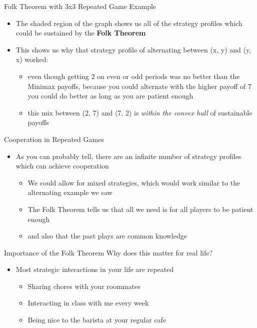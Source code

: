 \begin{frame}{Folk Theorem with 3x3 Repeated Game Example}
  \begin{itemize}
    \item The shaded region of the graph shows us all of the strategy profiles which could be sustained by the \textbf{Folk Theorem} 
    \item This shows us why that strategy profile of alternating between (x, y) and (y, x) worked: 
    \begin{itemize}
      \item even though getting 2 on even or odd periods was no better than the Minimax payoffs, because you could alternate with the higher payoff of 7 you could do better as long as you are patient enough 
      \item this mix between (2, 7) and (7, 2) is \textit{within the convex hull} of sustainable payoffs
    \end{itemize}
  \end{itemize} 
\end{frame}

\begin{frame}{Cooperation in Repeated Games}
  \begin{itemize}
    \item As you can probably tell, there are an infinite number of strategy profiles which can achieve cooperation 
    \begin{itemize}
      \item We could allow for mixed strategies, which would work similar to the alternating example we saw 
      \item The Folk Theorem tells us that all we need is for all players to be patient enough 
      \item and also that the past plays are common knowledge
    \end{itemize}
  \end{itemize}
\end{frame}

\begin{frame}{Importance of the Folk Theorem}
  Why does this matter for real life? 
  \begin{itemize}
    \item Most strategic interactions in your life are repeated 
    \begin{itemize}
      \item Sharing chores with your roommates 
      \item Interacting in class with me every week
      \item Being nice to the barista at your regular cafe
    \end{itemize}
  \end{itemize}
\end{frame}

